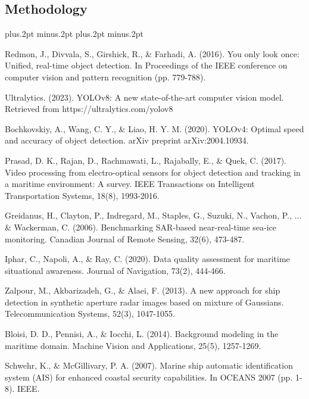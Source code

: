 \documentclass[twoside]{article}
\begin{document}
\begin{multicols}{2}
\section{Methodology}


\begin{thebibliography}{99}
\footnotesize
\itemsep=-3pt plus.2pt minus.2pt
\baselineskip=13pt plus.2pt minus.2pt

Redmon, J., Divvala, S., Girshick, R., \& Farhadi, A. (2016). You only look once: Unified, real-time object detection. In Proceedings of the IEEE conference on computer vision and pattern recognition (pp. 779-788).

Ultralytics. (2023). YOLOv8: A new state-of-the-art computer vision model. Retrieved from https://ultralytics.com/yolov8

Bochkovskiy, A., Wang, C. Y., \& Liao, H. Y. M. (2020). YOLOv4: Optimal speed and accuracy of object detection. arXiv preprint arXiv:2004.10934.

Prasad, D. K., Rajan, D., Rachmawati, L., Rajabally, E., \& Quek, C. (2017). Video processing from electro-optical sensors for object detection and tracking in a maritime environment: A survey. IEEE Transactions on Intelligent Transportation Systems, 18(8), 1993-2016.

Greidanus, H., Clayton, P., Indregard, M., Staples, G., Suzuki, N., Vachon, P., ... \& Wackerman, C. (2006). Benchmarking SAR-based near-real-time sea-ice monitoring. Canadian Journal of Remote Sensing, 32(6), 473-487.

Iphar, C., Napoli, A., \& Ray, C. (2020). Data quality assessment for maritime situational awareness. Journal of Navigation, 73(2), 444-466.

Zalpour, M., Akbarizadeh, G., \& Alaei, F. (2013). A new approach for ship detection in synthetic aperture radar images based on mixture of Gaussians. Telecommunication Systems, 52(3), 1047-1055.

Bloisi, D. D., Pennisi, A., \& Iocchi, L. (2014). Background modeling in the maritime domain. Machine Vision and Applications, 25(5), 1257-1269.

Schwehr, K., \& McGillivary, P. A. (2007). Marine ship automatic identification system (AIS) for enhanced coastal security capabilities. In OCEANS 2007 (pp. 1-8). IEEE.


\end{thebibliography}
\end{multicols}
\end{document}
